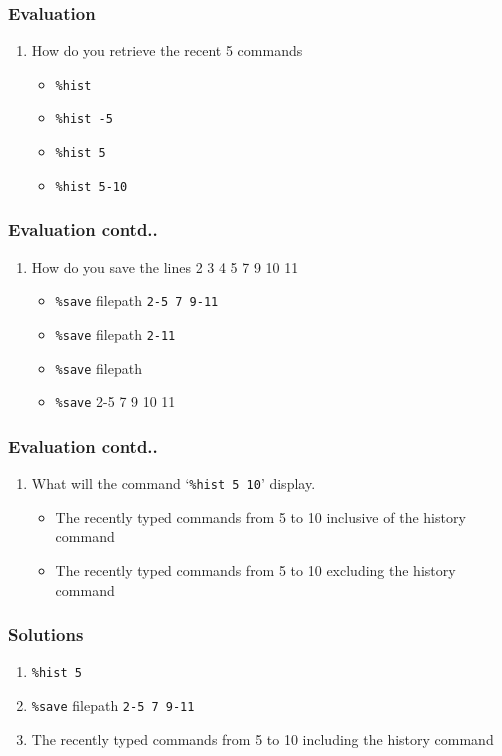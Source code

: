 \documentclass[17pt,compress]{beamer}
\newcounter{saveenumi}
\newcommand{\seti}{\setcounter{saveenumi}{\value{enumi}}}
\newcommand{\conti}{\setcounter{enumi}{\value{saveenumi}}}
\begin{document}
\begin{frame}
\frametitle{Evaluation}
\label{sec-10.1}
\begin{enumerate}
\item How do you retrieve the recent 5 commands\pause
\begin{itemize}
\item \texttt{\%hist}
\item \texttt{\%hist -5}
\item \texttt{\%hist 5}
\item \texttt{\%hist 5-10}
\end{itemize}
\seti
\end{enumerate}
\end{frame}
\begin{frame}
\frametitle{Evaluation contd..}
\label{sec-10.2}
\begin{enumerate}
\conti
\item How do you save the lines 2 3 4 5 7 9 10 11\pause
\begin{itemize}
\item \texttt{\%save} filepath \texttt{2-5 7 9-11}
\item \texttt{\%save} filepath \texttt{2-11}
\item \texttt{\%save} filepath
\item \texttt{\%save} 2-5 7 9 10 11
\end{itemize}
\end{enumerate}
\seti
\end{frame}
\begin{frame}
\frametitle{Evaluation contd..}
\label{sec-10.3}
\begin{enumerate}
\conti
\item What will the command `\texttt{\%hist 5 10}' display.\pause
\begin{itemize}
\item The recently typed commands from 5 to 10 inclusive of
the history command
\item The recently typed commands from 5 to 10 excluding
the history command
\end{itemize}
\end{enumerate}
\end{frame}
\begin{frame}
\frametitle{Solutions}
\label{sec-11}
\begin{enumerate}
\item \texttt{\%hist 5}\pause
\item \texttt{\%save} filepath \texttt{2-5 7 9-11}\pause
\item The recently typed commands from 5 to 10 including the history command
\end{enumerate}
\end{frame}
\end{document}
